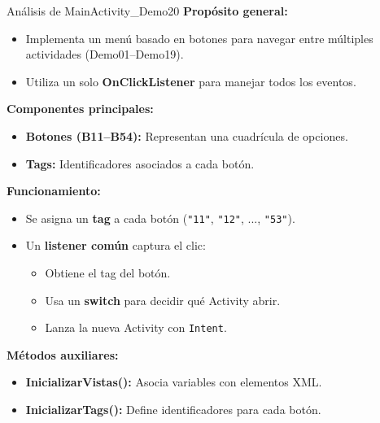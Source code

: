 \begin{frame}[fragile]{Análisis de MainActivity\_Demo20}
\textbf{Propósito general:}

\begin{itemize}
    \item Implementa un menú basado en botones para navegar entre múltiples actividades (Demo01–Demo19).
    \item Utiliza un solo \textbf{OnClickListener} para manejar todos los eventos.
\end{itemize}


\textbf{Componentes principales:}
\begin{itemize}
    \item \textbf{Botones (B11–B54):} Representan una cuadrícula de opciones.
    \item \textbf{Tags:} Identificadores asociados a cada botón.
\end{itemize}


\textbf{Funcionamiento:}
\begin{itemize}
    \item Se asigna un \textbf{tag} a cada botón (\texttt{"11"}, \texttt{"12"}, ..., \texttt{"53"}).
    \item Un \textbf{listener común} captura el clic:
    \begin{itemize}
        \item Obtiene el tag del botón.
        \item Usa un \textbf{switch} para decidir qué Activity abrir.
        \item Lanza la nueva Activity con \texttt{Intent}.
    \end{itemize}
\end{itemize}

\textbf{Métodos auxiliares:}
\begin{itemize}
    \item \textbf{InicializarVistas():} Asocia variables con elementos XML.
    \item \textbf{InicializarTags():} Define identificadores para cada botón.
\end{itemize}

\end{frame}


